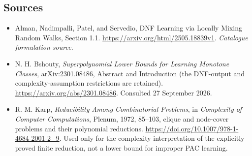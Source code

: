 \documentclass[11pt,a4paper]{article}
\numberwithin{equation}{section}
\begin{document}
\subsection{Sources}
\begin{itemize}\raggedright
\item[\textnormal{[S1]}]\hypertarget{source:30006796:1}{} Alman, Nadimpalli, Patel, and Servedio, DNF Learning via Locally Mixing Random Walks, Section 1.1.
\url{https://arxiv.org/html/2505.18839v1}.
{\small\textit{Catalogue formulation source.}}
\item[\textnormal{[E1]}]\hypertarget{extra:30006796:1}{}
N. H. Bshouty, \emph{Superpolynomial Lower Bounds for Learning Monotone
Classes}, arXiv:2301.08486, Abstract and Introduction (the DNF-output
and complexity-assumption restrictions are retained).
\url{https://arxiv.org/abs/2301.08486}. Consulted 27 September 2026.
\item[\textnormal{[E2]}]\hypertarget{extra:30006796:2}{}
R. M. Karp, \emph{Reducibility Among Combinatorial Problems}, in
\emph{Complexity of Computer Computations}, Plenum, 1972, 85--103,
clique and node-cover problems and their polynomial reductions.
\url{https://doi.org/10.1007/978-1-4684-2001-2_9}.
Used only for the complexity interpretation of the explicitly proved
finite reduction, not a lower bound for improper PAC learning.
\end{itemize}
\end{document}
